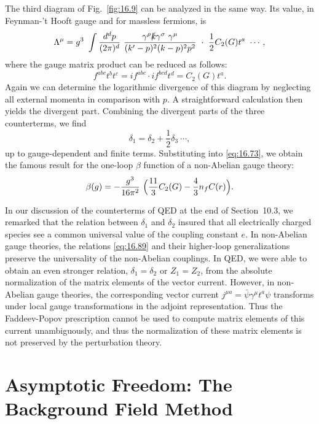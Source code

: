 The third diagram of Fig.~\ref{fig:16.9} can be analyzed in the same way.
Its value, in Feynman-'t Hooft gauge and for massless fermions, is
\begin{equation}
  \Lambda^\mu = g^3\ \int \frac{d^dp}{(2\pi)^d}\ \frac{\gamma^\rho
    \slashed{k}\gamma^\sigma\ \gamma^\mu }{(k'-p)^2(k-p)^2p^2}\ \cdot\
    \frac{1}{2}C_2(G)t^a\ \cdots ,
  \label{eq:16.82}
\end{equation}
where the gauge matrix product can be reduced as follows:
\begin{equation}
  f^{abc}t^bt^c = if^{abc}\cdot if^{bcd}t^d = C_2(G)t^a .
\end{equation}
Again we can determine the logarithmic divergence of this diagram by
neglecting all external momenta in comparison with $p$.  A straightforward
calculation then yields the divergent part.  Combining the divergent parts of
the three counterterms, we find
\begin{equation}
  \delta_1 = \delta_2 + \frac{1}{2}\delta_3\ \cdots ,
  \label{eq:16.89}
\end{equation}
up to gauge-dependent and finite terms.  Substituting into
\eqref{eq:16.73}, we obtain the famous result for the one-loop $\beta$
function of a non-Abelian gauge theory:
\begin{equation}
  \beta(g) = -\frac{g^3}{16\pi^2}\ \Bigl( \frac{11}{3}C_2(G)
    - \frac{4}{3}n_fC(r) \Bigr) .
  \label{eq:16.90}
\end{equation}

In our discussion of the counterterms of QED at the end of Section~10.3, we
remarked that the relation between $\delta_1$ and $\delta_2$ insured that all
electrically charged species see a common universal value of the coupling
constant $e$.  In non-Abelian gauge theories, the relations \eqref{eq:16.89}
and their higher-loop generalizations preserve the universality of the
non-Abelian couplings.  In QED, we were able to obtain an even stronger
relation, $\delta_1 = \delta_2$ or $Z_1 = Z_2$, from the absolute
normalization of the matrix elements of the vector current.  However, in
non-Abelian gauge theories, the corresponding vector current
$j^{\mu a} = \bar{\psi}\gamma^\mu t^a\psi$ transforms under local gauge
transformations in the adjoint representation.  Thus the Faddeev-Popov
prescription cannot be used to compute matrix elements of this current
unambiguously, and thus the normalization of these matrix elements is not
preserved by the perturbation theory.

\section{Asymptotic Freedom: The Background Field Method}

